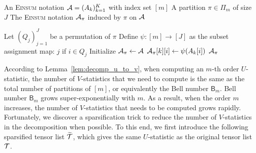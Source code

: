 \documentclass[letterpaper,11pt]{article}
\def\tilde{\widetilde}
\newcommand{\Lin}[1]{{\color{purple}{Lin: #1}}}
\newcommand{\Zhang}[1]{{\color{blue}{Zhang: #1}}}
\def\Einsum{\textsc{Einsum}}
\newcommand{\sPi}{\pi}
\newcommand{\partition}{\Pi}
\newcommand{\partitionp}[1]{\partition_{#1}}
\begin{document}
\begin{bibunit}[plainnat]
\begin{algorithm}
    \caption{Induced \Einsum{} Notation via Partition}
    \label{alg:induced_expression}
    \begin{algorithmic}[1]
        \Require 
        \Statex An \Einsum{} notation ${\mathcal{A}} = (A_k)_{k=1}^K$ with index set $[m]$ 
        \Statex A partition $\sPi \in \partitionp{m}$ of size $J$
        \Ensure The \Einsum{} notation $\calA_\sPi$ induced by $\sPi$ on ${\mathcal{A}}$

        \Function{InducedNotation}{$\calA; \sPi$}
            \State Let $(Q_j)_{j=1}^J$ be a permutation of $\sPi$
            \State Define $\psi \colon [m] \to [J]$ as the subset assignment map:
                \State \Return $j$ if $i \in Q_j$ 
            \EndFunction
            \State Initialize $\calA_\sPi \gets \calA$
                    \State $\calA_\sPi[k][i] \gets \psi(A_k[i])$
                \EndFor
            \EndFor
            \State \Return $\calA_\sPi$
        \EndFunction
    \end{algorithmic}
\end{algorithm}

According to Lemma~\ref{lem:decomp_u_to_v}, when computing an $m$-th order $U$-statistic, the number of $V$-statistics that we need to compute is the same as the total number of partitions of $[m]$, or equivalently the Bell number $\mathsf{B}_m$. Bell number $\mathsf{B}_m$ grows super-exponentially with $m$. %
As a result, when the order $m$ increases, the number of $V$-statistics that needs to be computed grows rapidly. Fortunately, we discover a sparsification trick to reduce the number of $V$-statistics in the decomposition when possible. To this end, we first introduce the following sparsified tensor list $\tilde{\calT}$, which gives the same $U$-statistic as the original tensor list ${\mathcal{T}}$.


\end{bibunit}
\end{document}
